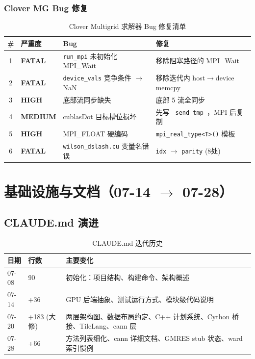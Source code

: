 \documentclass[11pt,a4paper]{article}
\newcommand{\fatal}{\textcolor{severityfatal}{\textbf{FATAL}}}
\newcommand{\high}{\textcolor{severityhigh}{\textbf{HIGH}}}
\newcommand{\med}{\textcolor{severitymed}{\textbf{MEDIUM}}}
\begin{document}
\subsubsection{Clover MG Bug 修复}

\begin{table}[ht]
\centering
\caption{Clover Multigrid 求解器 Bug 修复清单}
\begin{tabular}{cllp{4cm}}
\toprule
\# & 严重度 & Bug & 修复 \\
\midrule
1 & \fatal & \texttt{run\_mpi} 未初始化 MPI\_Wait & 移除阻塞路径的 MPI\_Wait \\
2 & \fatal & \texttt{device\_vals} 竞争条件 $\rightarrow$ NaN & 移除迭代内 host$\rightarrow$device memcpy \\
3 & \high & 底部流同步缺失 & 底部 5 流全同步 \\
4 & \med & cublasDot 目标槽位损坏 & 先写 \texttt{\_send\_tmp\_}，MPI 后复制 \\
5 & \high & MPI\_FLOAT 硬编码 & \texttt{mpi\_real\_type<T>()} 模板 \\
6 & \fatal & \texttt{wilson\_dslash.cu} 变量名错误 & \texttt{idx} $\rightarrow$ \texttt{parity} (8处) \\
\bottomrule
\end{tabular}
\end{table}

\section{基础设施与文档（07-14 $\rightarrow$ 07-28）}

\subsection{CLAUDE.md 演进}

\begin{table}[ht]
\centering
\caption{CLAUDE.md 迭代历史}
\begin{tabular}{lll}
\toprule
日期 & 行数 & 主要变化 \\
\midrule
07-08 & 90 & 初始化：项目结构、构建命令、架构概述 \\
07-14 & +36 & GPU 后端抽象、测试运行方式、模块级代码说明 \\
07-20 & +183 (大修) & 两层架构图、数据布局约定、C++ 计划系统、Cython 桥接、TileLang、cann 层 \\
07-28 & +66 & 方法列表细化、cann 详细文档、GMRES stub 状态、ward 索引惯例 \\
\bottomrule
\end{tabular}
\end{table}
\end{document}
